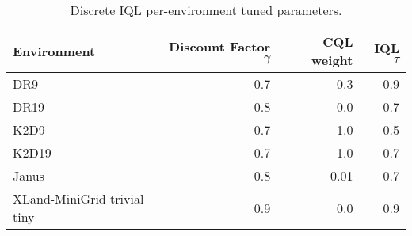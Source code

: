 \begin{table}[ht]
    \label{tab:dr9_stats}
    \begin{center}
    \caption{Discrete IQL per-environment tuned parameters.}
    \begin{small}
    \begin{adjustbox}{max width=\columnwidth}
		\begin{tabular}{l|rrr}
		\toprule
	\textbf{Environment} & \textbf{Discount Factor $\gamma$} & \textbf{CQL weight} & \textbf{IQL $\tau$}\\
\midrule
DR9 & 0.7 & 0.3 & 0.9\\
DR19 & 0.8 & 0.0 & 0.7\\
K2D9 & 0.7 & 1.0 & 0.5\\
K2D19 & 0.7 & 1.0 & 0.7\\
Janus & 0.8 & 0.01 & 0.7\\
XLand-MiniGrid trivial tiny & 0.9 & 0.0 & 0.9 \\
\bottomrule
\end{tabular}
        \end{adjustbox}
        \end{small}
    \end{center}
    \vskip -0.1in
\end{table}
    
